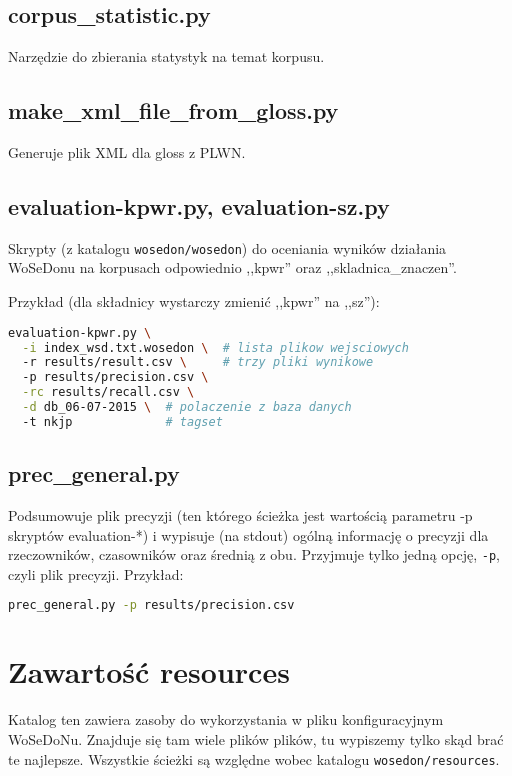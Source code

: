 \documentclass[10pt,a4paper]{article}
\begin{document}
\subsection{corpus\_statistic.py}  %
Narzędzie do zbierania statystyk na temat korpusu.

\subsection{make\_xml\_file\_from\_gloss.py}  %
Generuje plik XML dla gloss z PLWN.


\subsection{evaluation-kpwr.py, evaluation-sz.py} %
Skrypty (z katalogu \texttt{wosedon/wosedon}) do oceniania wyników działania WoSeDonu na korpusach odpowiednio ,,kpwr'' oraz ,,skladnica\_znaczen''.

Przykład (dla składnicy wystarczy zmienić ,,kpwr'' na ,,sz''):
\begin{lstlisting}[language=bash]
evaluation-kpwr.py \
  -i index_wsd.txt.wosedon \  # lista plikow wejsciowych
  -r results/result.csv \     # trzy pliki wynikowe
  -p results/precision.csv \
  -rc results/recall.csv \
  -d db_06-07-2015 \  # polaczenie z baza danych
  -t nkjp             # tagset
\end{lstlisting}


\subsection{prec\_general.py}
Podsumowuje plik precyzji (ten którego ścieżka jest wartością parametru -p skryptów evaluation-*) i wypisuje (na stdout) ogólną informację o precyzji dla rzeczowników, czasowników oraz średnią z obu. Przyjmuje tylko jedną opcję, \texttt{-p}, czyli plik precyzji. Przykład:

\begin{lstlisting}[language=bash]
prec_general.py -p results/precision.csv
\end{lstlisting}


\section{Zawartość resources}
\label{sec:resources_dir}
Katalog ten zawiera zasoby do wykorzystania w pliku konfiguracyjnym WoSeDoNu. Znajduje się tam wiele plików plików, tu wypiszemy tylko skąd brać te najlepsze. Wszystkie ścieżki są względne wobec katalogu \texttt{wosedon/resources}.
\end{document}
